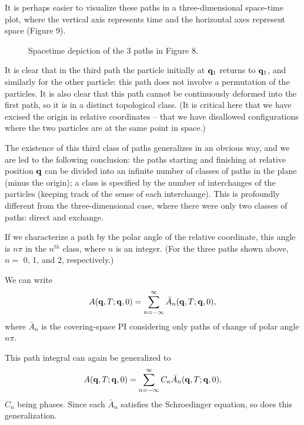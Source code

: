\documentclass[12pt]{article}
\begin{document}
It is perhaps easier to visualize these paths in a three-dimensional
space-time plot, where the vertical axis represents time and the
horizontal axes represent space (Figure 9).

\begin{figure}[ht]
\epsfysize=5cm
\centerline{}
\caption{Spacetime depiction of the 3 paths in Figure 8.}
\end{figure}


It is clear that in the third path the particle initially at ${\mathbf q}_1$ 
returns to ${\mathbf q}_1$, and similarly for the other particle: this path
does not involve a permutation of the particles. It is also
clear that this path cannot be continuously deformed
into the first path, so it is in a distinct topological class. (It
is critical here that we have excised the origin in relative
coordinates -- \ie that we have disallowed configurations where the two
particles are at the same point in space.)

The existence of this third class of paths generalizes in an obvious
way, and we are led to the following conclusion: the paths starting and
finishing at relative
position ${\mathbf q}$ can be divided into an infinite
number of classes of paths in the
plane (minus the origin); a class is specified by the number
of interchanges of
the particles (keeping track of the sense of each interchange). This
is profoundly different from the three-dimensional case, where there
were only two classes of paths: direct and exchange.

If we characterize
a path by the polar angle of the relative coordinate,
this angle is $n\pi$ in the $n^{th}$ class, where $n$ is an
integer. (For the three paths shown above, $n=$ 0, 1, and 2,
respectively.)

We can write
\[
A({\mathbf q},T;{\mathbf q},0)=\sum_{n=-\infty}^{\infty}{\bar A}_n({\mathbf q},T;{\mathbf q},0),
\]
where ${\bar A}_n$ is the covering-space
PI considering only paths of change of polar
angle $n\pi$.

This path integral can again be generalized to
\[
A({\mathbf q},T;{\mathbf q},0)=
\sum_{n=-\infty}^{\infty}C_n{\bar A}_n({\mathbf q},T;{\mathbf q},0),
\]
$C_n$ being phases. Since each ${\bar A}_n$ satisfies the Schroedinger
equation, so does this generalization. 
\end{document}
